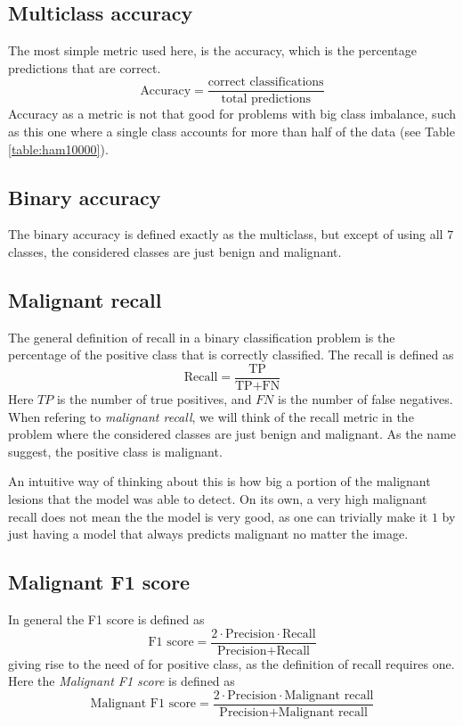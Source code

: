 \subsection{Multiclass accuracy}
The most simple metric used here, is the accuracy, which is the percentage predictions that are correct.
\[
    \text{Accuracy} = \frac{\text{correct classifications}}{\text{total predictions}}
\]
Accuracy as a metric is not that good for problems with big class imbalance,
such as this one where a single class accounts for more than half of the data (see Table \ref{table:ham10000}).

\subsection{Binary accuracy}
The binary accuracy is defined exactly as the multiclass, but except of using all $7$ classes,
the considered classes are just benign and malignant.

\subsection{Malignant recall}
The general definition of recall in a binary classification problem is the percentage of the positive class
that is correctly classified.
The recall is defined as
\[
    \text{Recall} = \frac{\text{TP}}{\text{TP} + \text{FN}}
\]
Here $TP$ is the number of true positives, and $FN$ is the number of false negatives.
When refering to \textit{malignant recall}, we will think of the recall metric in the problem
where the considered classes are just benign and malignant.
As the name suggest, the positive class is malignant.

An intuitive way of thinking about this is how big a portion of the malignant lesions
that the model was able to detect.
On its own, a very high malignant recall does not mean the the model is very good,
as one can trivially make it $1$ by just having a model that always predicts malignant no matter the image.

\subsection{Malignant F1 score}
In general the F1 score is defined as
\[
    \text{F1 score} = \frac{2 \cdot \text{Precision} \cdot \text{Recall}}{\text{Precision} + \text{Recall}}
\]
giving rise to the need of for positive class, as the definition of recall requires one.
Here the \textit{Malignant F1 score} is defined as
\[
    \text{Malignant F1 score} = \frac{2\cdot \text{Precision} \cdot \text{Malignant recall}}{\text{Precision} + \text{Malignant recall}}
\]

